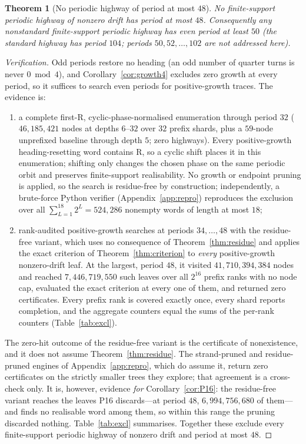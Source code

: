 \documentclass[11pt,reqno]{amsart}
\theoremstyle{plain}
\newtheorem{theorem}{Theorem}[section]
\theoremstyle{definition}
\newcommand{\turnR}{\mathrm{R}}
\begin{document}
\begin{theorem}[No periodic highway of period at most $48$]\label{thm:periodexcl}
No finite-support periodic highway of nonzero drift has period at most $48$.
Consequently any nonstandard finite-support periodic highway has even period at least
$50$ (the standard highway has period $104$; periods $50,52,\dots,102$ are not
addressed here).
\end{theorem}

\begin{proof}[Verification]
Odd periods restore no heading (an odd number of quarter turns is never
$0\bmod4$), and Corollary~\ref{cor:growth4} excludes zero growth at every period, so
it suffices to search even periods for positive-growth traces. The evidence is:
\begin{enumerate}[label=\textup{(\alph*)}]
\item a complete first-$\turnR$, cyclic-phase-normalised enumeration through
period $32$ ($46{,}185{,}421$ nodes at depths $6$--$32$ over $32$ prefix shards,
plus a $59$-node unprefixed baseline through depth $5$; zero highways). Every
positive-growth heading-resetting word contains $\turnR$, so a cyclic shift places
it in this enumeration; shifting only changes the chosen phase on the same periodic
orbit and preserves finite-support realisability. No growth or endpoint pruning is
applied, so the search is residue-free by construction;
independently, a brute-force Python verifier (Appendix~\ref{app:repro}) reproduces the
exclusion over all $\sum_{L=1}^{18}2^L=524{,}286$ nonempty words of length at most $18$;
\item rank-audited positive-growth searches at periods $34,\dots,48$ with the
residue-free variant, which uses no consequence of Theorem~\ref{thm:residue} and applies
the exact criterion of Theorem~\ref{thm:criterion} to \emph{every} positive-growth
nonzero-drift leaf. At the largest, period $48$, it visited $41{,}710{,}394{,}384$
nodes and reached $7{,}446{,}719{,}550$ such leaves over all $2^{16}$ prefix ranks with
no node cap, evaluated the exact criterion at every one of them, and returned zero
certificates. Every prefix rank is covered exactly once, every shard reports
completion, and the aggregate counters equal the sums of the per-rank counters
(Table~\ref{tab:excl}).
\end{enumerate}
The zero-hit outcome of the residue-free variant is the certificate of nonexistence, and
it does not assume Theorem~\ref{thm:residue}. The strand-pruned and residue-pruned
engines of Appendix~\ref{app:repro}, which do assume it, return zero certificates on
the strictly smaller trees they explore; that agreement is a cross-check only. It is,
however, evidence \emph{for} Corollary~\ref{cor:P16}: the residue-free variant reaches
the leaves P16 discards---at period $48$, $6{,}994{,}756{,}680$ of them---and finds no
realisable word among them, so within this range the pruning discarded nothing.
Table~\ref{tab:excl} summarises. Together these exclude every finite-support periodic
highway of nonzero drift and period at most $48$.
\end{proof}
\end{document}
